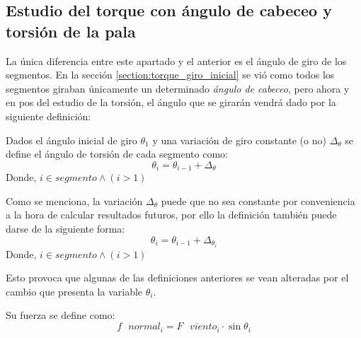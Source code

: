  
 
 
 
 
 
 
 
 
 
 
 \subsection{Estudio del torque con ángulo de cabeceo y torsión de la pala}
\label{section:torque_giro_torsion}

La única diferencia entre este apartado y el anterior es el ángulo de giro de los segmentos. En la sección \ref{section:torque_giro_inicial} se vió como todos los segmentos giraban únicamente un determinado \textit{ángulo de cabeceo}, pero ahora y en pos del estudio de la torsión, el ángulo que se girarán vendrá dado por la siguiente definición: 


\begin{definicion}
Dados el ángulo inicial de giro $\theta_1 $ y una variación de giro constante (o no) $\Delta_\theta$ se define el ángulo de torsión de cada segmento como:
$$\theta_i = \theta_{i-1} + \Delta_\theta$$ 
Donde,
\centering $i \in segmento \wedge (i > 1)$

\label{def:theta_cte}
\end{definicion}


\begin{definicion}
Como se menciona, la variación $\Delta_\theta$ puede que no sea constante por conveniencia a la hora de calcular resultados futuros, por ello la definición también puede darse de la siguiente forma:
$$\theta_i = \theta_{i-1} + \Delta_{\theta_{i}}$$ 
Donde,
\centering $i \in segmento \wedge (i > 1)$
\label{def:theta_nocte}
\end{definicion}


Esto provoca que algunas de las definiciones anteriores se vean alteradas por el cambio que presenta la variable $\theta_i$.\\

 

 \begin{definicion}
  Su fuerza se define como:
  $$ f \text{ } normal_i = F \text{ } viento_i \cdot \sin{\theta_i}$$
  \label{def:fuerza_normal_torsion}
 \end{definicion}


